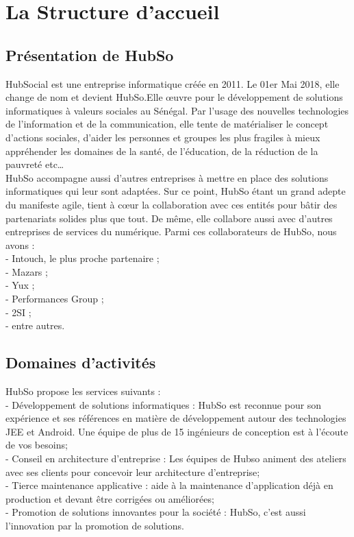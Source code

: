 \chapter{La Structure d'accueil}

\section{Présentation de HubSo}

HubSocial est une entreprise informatique créée en 2011. Le 01er Mai 2018, elle change de nom et devient HubSo.Elle œuvre pour le développement de solutions informatiques à valeurs sociales au Sénégal. Par l’usage des nouvelles technologies de l'information et de la communication, elle tente de matérialiser le concept d’actions sociales, d’aider les personnes et groupes les plus fragiles à mieux appréhender les domaines de la santé, de l’éducation, de la réduction de la pauvreté etc… \\
HubSo accompagne aussi d'autres entreprises à mettre en place des solutions informatiques qui leur sont adaptées. Sur ce point, HubSo étant un grand adepte du manifeste agile, tient à cœur la collaboration avec ces entités pour bâtir des partenariats solides plus que tout. De même, elle collabore aussi avec d'autres entreprises de services du numérique. Parmi ces collaborateurs de HubSo, nous avons : \\
- Intouch, le plus proche partenaire ;\\
- Mazars ;\\ 
- Yux ;\\
- Performances Group ;\\
- 2SI ;\\
- entre autres.

\section{Domaines d'activités}

HubSo propose les services suivants : \\
- Développement de solutions informatiques : HubSo est reconnue pour son expérience et ses références en matière de développement autour des technologies JEE et Android. Une équipe de plus de 15 ingénieurs de conception est à l'écoute de vos besoins; \\
- Conseil en architecture d'entreprise : Les équipes de Hubso animent des ateliers avec ses clients  pour concevoir leur architecture d'entreprise; \\
- Tierce maintenance applicative : aide à la maintenance d'application déjà en production et devant être corrigées ou améliorées; \\
- Promotion de solutions innovantes pour la société : HubSo, c'est aussi l'innovation par la promotion de solutions.\\

